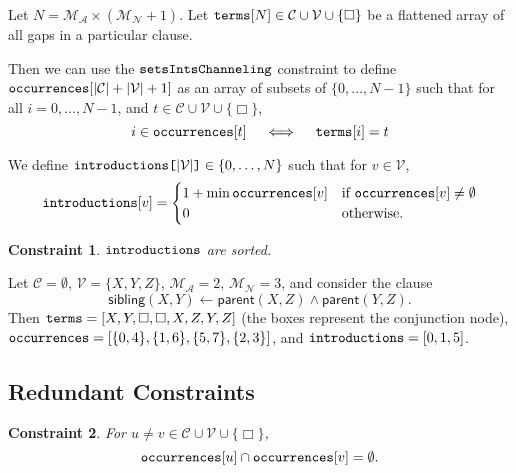 \documentclass[runningheads]{llncs}
\newtheorem{constraint}{Constraint}
\newcommand{\variable}[1]{\texttt{\textup{#1}}}
\newcommand{\arrayd}[3]{\variable{{#1}[}{#2}\variable{]} \in {#3}}
\newcommand{\variables}{\mathcal{V}}
\newcommand{\constants}{\mathcal{C}}
\newcommand{\maxArity}{\mathcal{M}_{\mathcal{A}}}
\newcommand{\maxNumNodes}{\mathcal{M}_{\mathcal{N}}}
\begin{document}
\begin{definition}
  Let $N = \maxArity{} \times (\maxNumNodes{} + 1)$. Let
  $\variable{terms}[N] \in \constants{} \cup \variables{} \cup \{ \Box
  \}$ be a flattened array of all gaps in a particular clause.

  Then we can use the $\variable{setsIntsChanneling}$ constraint
  to define $\variable{occurrences}[|\constants{}| + |\variables{}| + 1]$ as an
  array of subsets of $\{ 0, \dots, N-1 \}$ such that for all $i = 0, \dots, N
  - 1$, and $t \in \constants{} \cup \variables{} \cup \{ \Box \}$,
  \[
    i \in \variable{occurrences}[t] \quad \iff \quad
    \variable{terms}[i] = t
  \]
\end{definition}

\begin{definition}
  We define $\arrayd{introductions}{|\variables{}|}{\{ 0, \dots, N \}}$ such
  that for $v \in \variables{}$,
  \[
    \variable{introductions}[v] = \begin{cases}
      1 + \min \variable{occurrences}[v] & \text{if }
      \variable{occurrences}[v] \ne \emptyset\\
      0 & \text{otherwise.}
    \end{cases}
  \]
\end{definition}

\begin{constraint}
  $\variable{introductions}$ are sorted.
\end{constraint}

\begin{example}
  Let $\constants{} = \emptyset$, $\variables{} = \{ X, Y, Z \}$, $\maxArity{} =
  2$, $\maxNumNodes{} = 3$, and consider the clause
  \[
    \mathsf{sibling}(X, Y) \gets \mathsf{parent}(X, Z) \land
    \mathsf{parent}(Y, Z).
  \]
  Then $\variable{terms} = [X, Y, \Box, \Box, X, Z, Y, Z]$ (the boxes represent
  the conjunction node), $\variable{occurrences} = [\{ 0, 4 \}, \{ 1, 6 \},
  \{ 5, 7 \}, \{ 2, 3 \}]$, and $\variable{introductions} = [0, 1, 5]$.
\end{example}

\subsection{Redundant Constraints}

\begin{constraint}
  For $u \ne v \in \constants{} \cup \variables{} \cup \{ \Box \}$,
  \[
    \variable{occurrences}[u] \cap \variable{occurrences}[v] = \emptyset.
  \]
\end{constraint}
\end{document}
